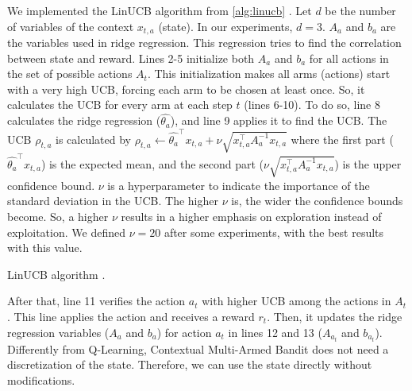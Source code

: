 We implemented the LinUCB algorithm from \ref{alg:linucb} \cite{recommender2020}. Let $d$ be the number of variables of the context $x_{t,a}$ (state). In our experiments, $d=3$. $A_a$ and $b_a$ are the variables used in ridge regression. This regression tries to find the correlation between state and reward. Lines 2-5 initialize both $A_a$ and $b_a$ for all actions in the set of possible actions $A_t$. This initialization makes all arms (actions) start with a very high UCB, forcing each arm to be chosen at least once. So, it calculates the UCB for every arm at each step $t$ (lines 6-10). To do so, line 8 calculates the ridge regression ($\hat{\theta_a}$), and line 9 applies it to find the UCB. The UCB $\rho_{t, a}$ is calculated by $\rho_{t, a} \leftarrow \hat{\theta_a}^\top x_{t,a} + \nu \sqrt{x_{t,a}^\top A_{a}^{-1} x_{t,a}}$ where the first part ($\hat{\theta_a}^\top x_{t,a}$) is the expected mean, and the second part ($\nu \sqrt{x_{t,a}^\top A_{a}^{-1} x_{t,a}}$) is the upper confidence bound. $\nu$ is a hyperparameter to indicate the importance of the standard deviation in the UCB. The higher $\nu$ is, the wider the confidence bounds become. So, a higher $\nu$ results in a higher emphasis on exploration instead of exploitation. We defined $\nu = 20$ after some experiments, with the best results with this value.

\IncMargin{1em}
\begin{algorithm}[!htb]
    \footnotesize
    \SetAlgoLined
    \caption{LinUCB algorithm \cite{li2010contextual}.}
    \label{alg:linucb}
\end{algorithm}
\DecMargin{1em}

After that, line 11 verifies the action $a_t$ with higher UCB among the actions in $A_t$. This line applies the action and receives a reward $r_t$. Then, it updates the ridge regression variables ($A_a$ and $b_a$) for action $a_t$ in lines 12 and 13 ($A_{a_{t}}$ and $b_{a_{t}}$). Differently from Q-Learning, Contextual Multi-Armed Bandit does not need a discretization of the state. Therefore, we can use the state directly without modifications.

